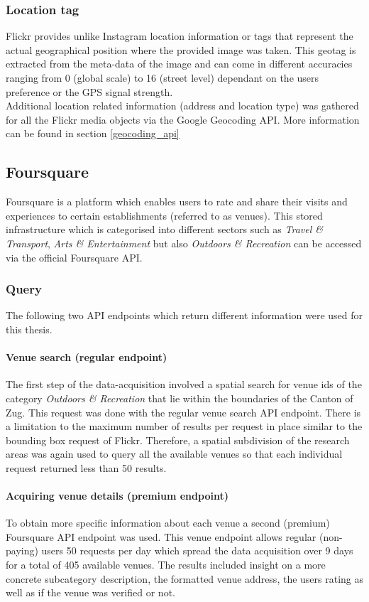 \subsubsection{Location tag} \label{flickr_location_tag}
Flickr provides unlike Instagram location information or tags that represent the actual geographical position where the provided image was taken. This geotag is extracted from the meta-data of the image and can come in different accuracies ranging from 0 (global scale) to 16 (street level) dependant on the users preference or the GPS signal strength. \\
Additional location related information (address and location type) was gathered for all the Flickr media objects via the Google Geocoding API. More information can be found in section \ref{geocoding_api}

\subsection{Foursquare} \label{foursquare}
Foursquare is a platform which enables users to rate and share their visits and experiences to certain establishments (referred to as venues). This stored infrastructure which is categorised into different sectors such as \textit{Travel \& Transport}, \textit{Arts \& Entertainment} but also \textit{Outdoors \& Recreation} can be accessed via the official Foursquare API.

\subsubsection{Query} \label{foursquare_query}
The following two API endpoints which return different information were used for this thesis.
\paragraph*{Venue search (regular endpoint)} \label{foursquare_endpoint1}
The first step of the data-acquisition involved a spatial search for venue ids of the category \textit{Outdoors \& Recreation} that lie within the boundaries of the Canton of Zug. This request was done with the regular venue search API endpoint. There is a limitation to the maximum number of results per request in place similar to the bounding box request of Flickr. Therefore, a spatial subdivision of the research areas was again used to query all the available venues so that each individual request returned less than 50 results.
\paragraph*{Acquiring venue details (premium endpoint)} \label{foursquare_endpoint2}
To obtain more specific information about each venue a second (premium) Foursquare API endpoint was used. This venue endpoint allows regular (non-paying) users 50 requests per day which spread the data acquisition over 9 days for a total of 405 available venues. The results included insight on a more concrete subcategory description, the formatted venue address, the users rating as well as if the venue was verified or not.


